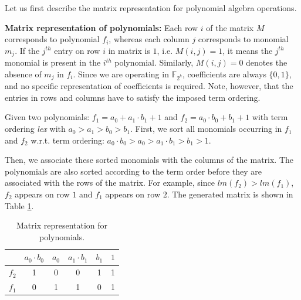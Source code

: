 
Let us first describe the matrix representation for polynomial algebra
operations. 


{\bf Matrix representation of polynomials:} Each row $i$ of the matrix
$M$ corresponds to polynomial $f_i$, whereas each column $j$
corresponds to monomial $m_j$.
If the $j^{th}$ entry on row $i$ in matrix is $1$, i.e. $M(i, j) = 1$,
it means the $j^{th}$ monomial is present in the $i^{th}$ polynomial.
Similarly, $M(i, j) = 0$ denotes the absence of $m_j$ in $f_i$. 
Since we are operating in $\mathbb{F}_{2^k}$, coefficients
are always $\{0, 1\}$, and no specific representation of coefficients
is required. Note, however, that the entries in rows and columns have
to satisfy the imposed term ordering. 
 
\begin{Example}
Given two polynomials: $f_{1}=a_{0}+a_{1}\cdot b_{1}+1$ and
$f_{2}=a_{0}\cdot b_{0}+b_{1}+1$ with term ordering {\it lex} with
$a_{0}>a_{1}>b_{0}>b_{1}$.  First, we sort all monomials occurring in
$f_{1}$ and $f_{2}$ w.r.t. term ordering: $a_{0}\cdot b_{0}
>a_{0}>a_{1}\cdot b_{1}> b_{1}>1$. 

Then, we associate these sorted monomials with the columns of the
matrix. The polynomials are also sorted according to the term order
before they are associated with the rows of the matrix. For example,
since $lm(f_{2})>lm(f_{1})$, $f_{2}$ appears on row $1$ and $f_{1}$
appears on row $2$. 
The generated matrix is shown in Table \ref{tab:matrix}. 

	\begin{table}[t]
	\begin{center}
	\caption{Matrix representation for polynomials.}
	\label{tab:matrix}
	\begin{tabular}{|c|c|c|c|c|c|} \hline 
			&$a_{0}\cdot b_{0}$  	&$a_{0}$ 	&$a_{1}\cdot b_{1}$		&$b_{1}$ 	&$1$  \\
	\hline 
	$f_{2}$ & 1 &0 & 0 & 1 & 1 \\
	\hline
	$f_{1}$ & 0 &1 & 1 & 0 & 1 \\
	\hline
	\end{tabular}
	\end{center}
	\end{table}
\end{Example}	


